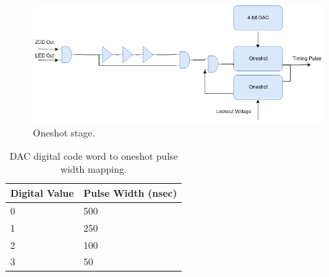 \documentclass[12pt,oneside,final]{siuethesis}
\theoremstyle{definition}
\begin{document}
\begin{figure}[ht]
\centering
\includegraphics[scale=.6,keepaspectratio=true]{images/oneshot_stage.png} 
\caption{Oneshot stage.}
\label{fig:oneshot-stage}
\end{figure}
\begin{table}[ht]
\centering
	\begin{tabular}{|l|p{4cm}|}
		\hline
		Digital Value & Pulse Width (nsec)\\\hline
		0 & 500\\\hline
		1 & 250\\\hline
		2 & 100\\\hline
		3 & 50\\\hline
	\end{tabular}
    \caption{DAC digital code word to oneshot pulse width mapping.}
 	\label{Tab:oneshot-pw}
\end{table}
\end{document}
